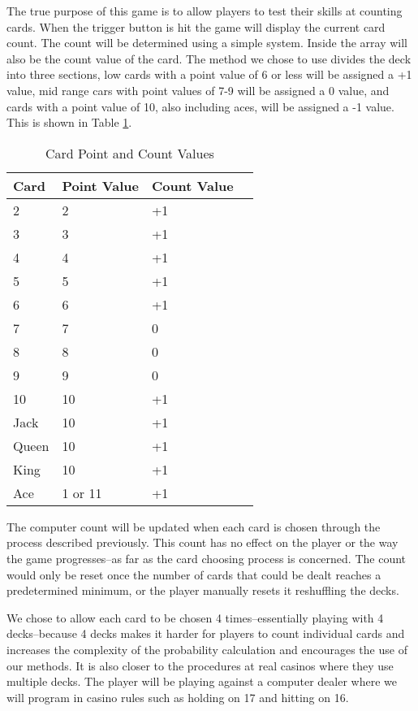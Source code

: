\documentclass[12pt]{article}
\begin{document}
The true purpose of this game is to allow players to test their skills at counting cards. When the trigger button is hit the game will display the current card count. The count will be determined using a simple system. Inside the array will also be the count value of the card. The method we chose to use divides the deck into three sections, low cards with a point value of 6 or less will  be assigned a +1 value, mid range cars with point values of 7-9 will be assigned a 0 value, and cards with a point value of 10, also including aces, will be assigned a -1 value. This is shown in Table \ref{table:card_points}. 

\begin{table}[ht]
\begin{tabular}{|l|l|l|l|}
\hline
\textbf{Card} & \textbf{Point Value} & \textbf{Count Value} \\ \hline
2 & 2 & +1 \\ \hline
3 & 3 & +1 \\ \hline
4 & 4 & +1 \\ \hline
5 & 5 & +1 \\ \hline
6 & 6 & +1 \\ \hline
7 & 7 & 0 \\ \hline
8 & 8 & 0 \\ \hline
9 & 9 & 0 \\ \hline
10 & 10 & +1 \\ \hline
Jack & 10 & +1 \\ \hline
Queen & 10 & +1 \\ \hline
King & 10 & +1 \\ \hline
Ace & 1 or 11 & +1 \\ \hline
\end{tabular}
\caption{Card Point and Count Values}
\label{table:card_points}
\end{table}

The computer count will be updated when each card is chosen through the process described previously. This count has no effect on the player or the way the game progresses–as far as the card choosing process is concerned. The count would only be reset once the number of cards that could be dealt reaches a predetermined minimum, or the player manually resets it reshuffling the decks.

We chose to allow each card to be chosen 4 times–essentially playing with 4 decks–because 4 decks makes it harder for players to count individual cards and increases the complexity of the probability calculation and encourages the use of our methods. It is also closer to the procedures at real casinos where they use multiple decks. The player will be playing against a computer dealer where we will program in casino rules such as holding on 17 and hitting on 16. 
\end{document}
